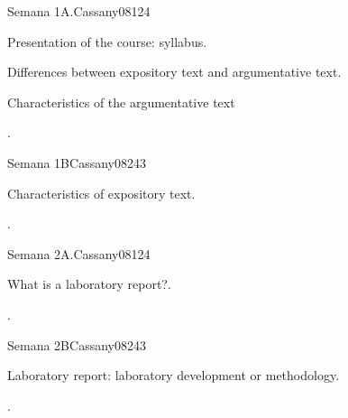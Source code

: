 \begin{syllabus}
\begin{competences}
    \item {}
\end{competences}

\begin{unit}{}{Semana 1A.}{Cassany08}{12}{4}
   \begin{topics}
      \item Presentation of the course: syllabus.
      \item Differences between expository text and argumentative text.
      \item Characteristics of the argumentative text
   \end{topics}
   \begin{learningoutcomes}
      \item .
   \end{learningoutcomes}
\end{unit}

\begin{unit}{}{Semana 1B}{Cassany08}{24}{3}
   \begin{topics}
      \item Characteristics of expository text.
   \end{topics}

   \begin{learningoutcomes}
      \item . 
      \end{learningoutcomes}
\end{unit}

\begin{unit}{}{Semana 2A.}{Cassany08}{12}{4}
   \begin{topics}
      \item What is a laboratory report?.
   \end{topics}
   \begin{learningoutcomes}
      \item .
   \end{learningoutcomes}
\end{unit}

\begin{unit}{}{Semana 2B}{Cassany08}{24}{3}
   \begin{topics}
      \item Laboratory report: laboratory development or methodology.
   \end{topics}

   \begin{learningoutcomes}
      \item .
      \end{learningoutcomes}
\end{unit}


\end{syllabus}
